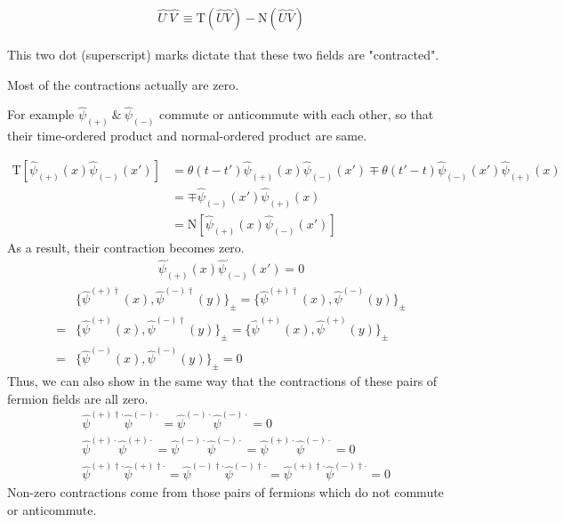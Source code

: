 \begin{align}
\hat{U^{\cdot}}\hat{V^{\cdot}} \equiv \mathrm{T}(\hat{U}\hat{V})-\mathrm{N}(\hat{U}\hat{V}) \nonumber
\end{align}

This two dot (superscript) marks dictate that these two fields are "contracted".

Most of the  contractions actually are zero.

For example $\hat \psi_{(+)} \ \&\  \hat \psi_{(-)}$ commute or anticommute with each other, so that their time-ordered product and normal-ordered product are same.

\begin{align}
\mathrm{T}[\hat \psi_{(+)}(x)\hat \psi_{(-)}(x')]&=\theta(t-t')\hat \psi_{(+)}(x)\hat \psi_{(-)}(x')\mp \theta(t'-t)\hat \psi_{(-)}(x')\hat \psi_{(+)}(x) \nonumber \\
&=\mp\hat \psi_{(-)}(x')\hat \psi_{(+)}(x) \nonumber \\
&=\mathrm{N}[\hat \psi_{(+)}(x)\hat \psi_{(-)}(x')] \nonumber
\end{align}
As a result, their contraction becomes zero.
\begin{align}
\hat \psi^{\cdot}_{(+)}(x)\hat \psi^{\cdot}_{(-)}(x')=0\nonumber
\end{align}
\begin{align}
&\{\hat \psi^{(+)\dagger}(x),\hat \psi^{(-)\dagger}(y)\}_{\pm}=\{\hat \psi^{(+)\dagger}(x),\hat \psi^{(-)}(y)\}_{\pm} \nonumber \\
=&\{\hat \psi^{(+)}(x),\hat \psi^{(-)\dagger}(y)\}_{\pm}=\{\hat \psi^{(+)}(x),\hat \psi^{(+)}(y)\}_{\pm} \nonumber \\
=&\{\hat \psi^{(-)}(x),\hat \psi^{(-)}(y)\}_{\pm}= 0 \nonumber
\end{align}
Thus, we can also show in the same way that the contractions of these pairs of fermion fields are all zero.
\begin{align}
&\hat \psi^{(+)\dagger\cdot}\hat \psi^{(-)\cdot}=\hat \psi^{(-)\cdot}\hat \psi^{(-)\cdot}=0 \nonumber \\
&\hat \psi^{(+)\cdot}\hat \psi^{(+)\cdot}=\hat \psi^{(-)\cdot}\hat \psi^{(-)\cdot}=\hat \psi^{(+)\cdot}\hat \psi^{(-)\cdot}=0\nonumber \\
&\hat \psi^{(+)\dagger\cdot}\hat \psi^{(+)\dagger\cdot}=\hat \psi^{(-)\dagger\cdot}\hat \psi^{(-)\dagger\cdot}=\hat \psi^{(+)\dagger\cdot}\hat \psi^{(-)\dagger\cdot}=0 \nonumber
\end{align}
Non-zero contractions come from those pairs of fermions which do not commute or anticommute.

